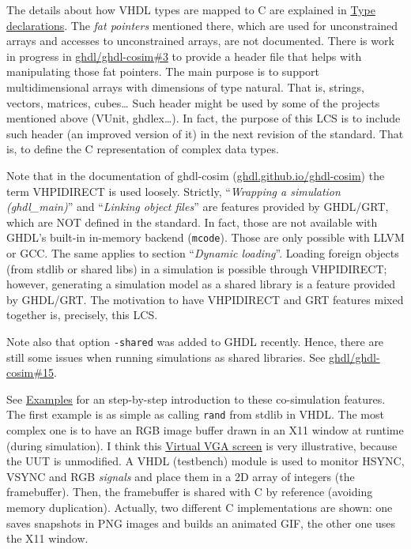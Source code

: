 \documentclass[
]{article}
\begin{document}
The details about how VHDL types are mapped to C are explained in \href{https://ghdl.github.io/ghdl-cosim/vhpidirect/declarations.html}{Type declarations}. The \emph{fat pointers} mentioned there, which are used for unconstrained arrays and accesses to unconstrained arrays, are not documented. There is work in progress in \href{https://github.com/ghdl/ghdl-cosim/issues/3}{ghdl/ghdl-cosim\#3} to provide a header file that helps with manipulating those fat pointers. The main purpose is to support multidimensional arrays with dimensions of type natural. That is, strings, vectors, matrices, cubes\ldots{} Such header might be used by some of the projects mentioned above (VUnit, ghdlex\ldots). In fact, the purpose of this LCS is to include such header (an improved version of it) in the next revision of the standard. That is, to define the C representation of complex data types.

Note that in the documentation of ghdl-cosim (\href{https://ghdl.github.io/ghdl-cosim/index.html}{ghdl.github.io/ghdl-cosim}) the term VHPIDIRECT is used loosely. Strictly, ``\emph{Wrapping a simulation (ghdl\_main)}'' and ``\emph{Linking object files}'' are features provided by GHDL/GRT, which are NOT defined in the standard. In fact, those are not available with GHDL's built-in in-memory backend (\texttt{mcode}). Those are only possible with LLVM or GCC. The same applies to section ``\emph{Dynamic loading}''. Loading foreign objects (from stdlib or shared libs) in a simulation is possible through VHPIDIRECT; however, generating a simulation model as a shared library is a feature provided by GHDL/GRT. The motivation to have VHPIDIRECT and GRT features mixed together is, precisely, this LCS.

Note also that option \texttt{-shared} was added to GHDL recently. Hence, there are still some issues when running simulations as shared libraries. See \href{https://github.com/ghdl/ghdl-cosim/pull/15}{ghdl/ghdl-cosim\#15}.

See \href{https://ghdl.github.io/ghdl-cosim/vhpidirect/examples/index.html}{Examples} for an step-by-step introduction to these co-simulation features. The first example is as simple as calling \texttt{rand} from stdlib in VHDL. The most complex one is to have an RGB image buffer drawn in an X11 window at runtime (during simulation). I think this \href{https://ghdl.github.io/ghdl-cosim/vhpidirect/examples/arrays.html\#virtual-vga-screen}{Virtual VGA screen} is very illustrative, because the UUT is unmodified. A VHDL (testbench) module is used to monitor HSYNC, VSYNC and RGB \emph{signals} and place them in a 2D array of integers (the framebuffer). Then, the framebuffer is shared with C by reference (avoiding memory duplication). Actually, two different C implementations are shown: one saves snapshots in PNG images and builds an animated GIF, the other one uses the X11 window.
\end{document}
